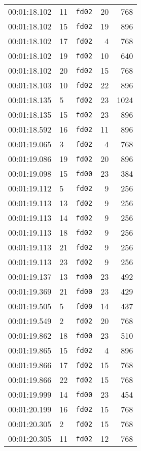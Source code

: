 \documentclass{article}
\begin{document}
\begin{longtable}{lllrr}
00:01:18.102 & 11 & \texttt{fd02} & 20 & 768 \\
00:01:18.102 & 15 & \texttt{fd02} & 19 & 896 \\
00:01:18.102 & 17 & \texttt{fd02} & 4 & 768 \\
00:01:18.102 & 19 & \texttt{fd02} & 10 & 640 \\
00:01:18.102 & 20 & \texttt{fd02} & 15 & 768 \\
00:01:18.103 & 10 & \texttt{fd02} & 22 & 896 \\
00:01:18.135 & 5 & \texttt{fd02} & 23 & 1024 \\
00:01:18.135 & 15 & \texttt{fd02} & 23 & 896 \\
00:01:18.592 & 16 & \texttt{fd02} & 11 & 896 \\
00:01:19.065 & 3 & \texttt{fd02} & 4 & 768 \\
00:01:19.086 & 19 & \texttt{fd02} & 20 & 896 \\
00:01:19.098 & 15 & \texttt{fd00} & 23 & 384 \\
00:01:19.112 & 5 & \texttt{fd02} & 9 & 256 \\
00:01:19.113 & 13 & \texttt{fd02} & 9 & 256 \\
00:01:19.113 & 14 & \texttt{fd02} & 9 & 256 \\
00:01:19.113 & 18 & \texttt{fd02} & 9 & 256 \\
00:01:19.113 & 21 & \texttt{fd02} & 9 & 256 \\
00:01:19.113 & 23 & \texttt{fd02} & 9 & 256 \\
00:01:19.137 & 13 & \texttt{fd00} & 23 & 492 \\
00:01:19.369 & 21 & \texttt{fd00} & 23 & 429 \\
00:01:19.505 & 5 & \texttt{fd00} & 14 & 437 \\
00:01:19.549 & 2 & \texttt{fd02} & 20 & 768 \\
00:01:19.862 & 18 & \texttt{fd00} & 23 & 510 \\
00:01:19.865 & 15 & \texttt{fd02} & 4 & 896 \\
00:01:19.866 & 17 & \texttt{fd02} & 15 & 768 \\
00:01:19.866 & 22 & \texttt{fd02} & 15 & 768 \\
00:01:19.999 & 14 & \texttt{fd00} & 23 & 454 \\
00:01:20.199 & 16 & \texttt{fd02} & 15 & 768 \\
00:01:20.305 & 2 & \texttt{fd02} & 15 & 768 \\
00:01:20.305 & 11 & \texttt{fd02} & 12 & 768 \\

\end{longtable}
\end{document}
